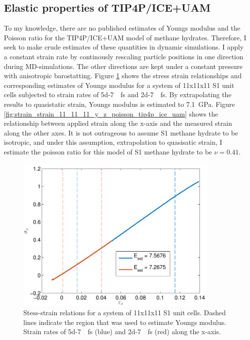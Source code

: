 \subsection{Elastic properties of TIP4P/ICE+UAM}
To my knowledge, there are no published estimates of Youngs modulus and the Poisson ratio for the TIP4P/ICE+UAM model of methane hydrates. Therefore, I seek to make crude estimates of these quantities in dynamic simulations. I apply a constant strain rate by continously rescaling particle positions in one direction during MD-simulations. The other directions are kept under a constant pressure with anisotropic barostatting.
Figure \ref{fig:stress_strain_11_11_11_tip4p_ice_uam} shows the stress strain relationships and corresponding estimates of Youngs modulus for a system of 11x11x11 S1 unit cells subjected to strain rates of \SI{5d-7}{\per\femto\second} and \SI{2d-7}{\per\femto\second}. By extrapolating the results to quasistatic strain, Youngs modulus is estimated to \SI{7.1}{\giga\pascal}. 
Figure \ref{fig:strain_strain_11_11_11_y_z_poisson_tip4p_ice_uam} shows the relationship between applied strain along the x-axis and the measured strain along the other axes. It is not outrageous to assume S1 methane hydrate to be isotropic, and under this assumption, extrapolation to quasisatic strain, I estimate the poisson ratio for this model of S1 methane hydrate to be $\nu = 0.41$. 

\begin{figure}
\includegraphics[width=10cm]{../figures/thesis/stress_strain_11_11_11_tip4p_ice_uam.pdf}
\caption{Stess-strain relations for a system of 11x11x11 S1 unit cells. Dashed lines indicate the region that was used to estimate Youngs modulus. Strain rates of \SI{5d-7}{\per\femto\second} (blue) and \SI{2d-7}{\per\femto\second} (red) along the x-axis.}
\label{fig:stress_strain_11_11_11_tip4p_ice_uam}

\end{figure}

